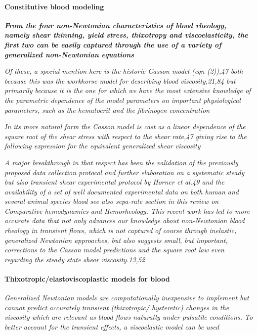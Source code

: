 \documentclass[11pt,letterpaper]{article}
\begin{document}
\paragraph{Constitutive blood modeling}

{\color{blue}
\textbf{\textit{ From the four non-Newtonian characteristics of blood rheology,
namely shear thinning, yield stress, thixotropy and viscoelasticity, the first two can be easily captured through the use of a variety of generalized non-Newtonian equations}}}

\textit{Of these, a special mention here is the historic Casson model (eqn (2)),47 both because this was the workhorse model for describing blood viscosity,21,84 but primarily because it is the one for which we have the most extensive knowledge of the parametric dependence of the model parameters on important physiological parameters, such as the hematocrit and the fibrinogen concentration}

\textit{In its more natural form the Casson model is cast as a linear dependence of the square root of the shear stress with respect to the shear rate,47 giving rise to the following expression for the equivalent generalized shear viscosity}

\textit{
A major breakthrough in that respect has
been the validation of the previously proposed data collection
protocol and further elaboration on a systematic steady but
also transient shear experimental protocol by Horner et al.49 and
the availability of a set of well documented experimental data on
both human and several animal species blood see also sepa-rate section in this review on Comparative hemodynamics and
Hemorheology. This recent work has led to more accurate data
that not only advances our knowledge about non-Newtonian
blood rheology in transient flows, which is not captured of course
through inelastic, generalized Newtonian approaches, but also
suggests small, but important, corrections to the Casson model
predictions and the square root law even regarding the steady
state shear viscosity.13,52}




\paragraph{Thixotropic/elastoviscoplastic models for blood}
\textit{Generalized Newtonian models are computationally inexpensive to implement but cannot predict accurately transient (thixotropic/ hysteretic) changes in the viscosity which are relevant as blood flows naturally under pulsatile conditions. To better account for the transient effects, a viscoelastic model can be used}
\end{document}
